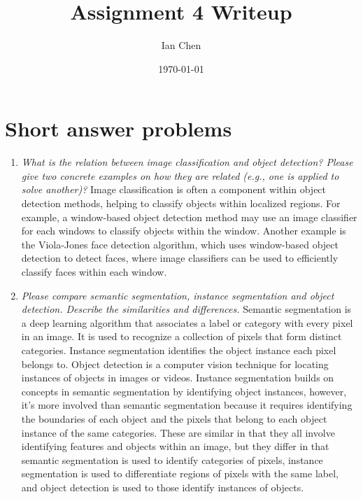 \documentclass[11pt]{article}
\title{Assignment 4 Writeup}
\author{Ian Chen}
\date{\today}
\begin{document}
    \maketitle


    \section{Short answer problems}

    \begin{enumerate}
        \item \textit{What is the relation between image classification and object detection?
        Please give two concrete examples on how they are related (e.g., one is applied to solve another)?}
        Image classification is often a component within object detection methods, helping to classify objects
        within localized regions. For example, a window-based object detection method may use an image classifier for
        each windows to classify objects within the window. Another example is the Viola-Jones face detection
        algorithm, which uses window-based object detection to detect faces, where image classifiers can be used to
        efficiently classify faces within each window.

        \item \textit{Please compare semantic segmentation, instance segmentation and object detection.
        Describe the similarities and differences.}
        Semantic segmentation is a deep learning algorithm that associates a label or category with every pixel in an
        image.
        It is used to recognize a collection of pixels that form distinct categories.
        Instance segmentation identifies the object instance each pixel belongs to.
        Object detection is a computer vision technique for locating instances of objects in images or videos.
        Instance segmentation builds on concepts in semantic segmentation by identifying object instances, however,
        it's more involved than semantic segmentation because it requires identifying the boundaries of each object
        and the pixels that belong to each object instance of the same categories.
        These are similar in that they all involve identifying features and objects within an image, but they differ in
        that semantic segmentation is used to identify categories of pixels, instance segmentation is used to
        differentiate regions of pixels with the same label, and object detection is used to those identify instances
        of objects.


\end{enumerate}
\end{document}
